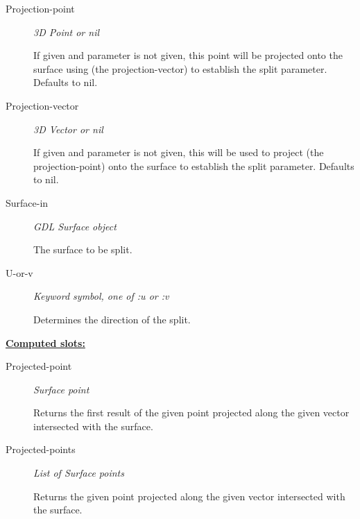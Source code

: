 \documentclass [11pt]{book}
\begin{document}
\begin{itemize}
\begin{description}
\item [Projection-point]
\emph{3D Point or nil}

 If given and parameter is not given,
this point will be projected onto the surface using (the projection-vector)
to establish the split parameter. Defaults to nil.




\item [Projection-vector]
\emph{3D Vector or nil}

 If given and parameter is not given,
this will be used to project (the projection-point)
onto the surface to establish the split parameter.
Defaults to nil.




\item [Surface-in]
\emph{GDL Surface object}

 The surface to be split.




\item [U-or-v]
\emph{Keyword symbol, one of :u or :v}

 Determines the direction of the split.




\end{description}






\textbf{
\underline{Computed slots:}}

\begin{description}

\item [Projected-point]
\emph{Surface point}

 Returns the first result of the given point projected
along the given vector intersected with the surface.




\item [Projected-points]
\emph{List of Surface points}

 Returns the given point projected along
the given vector intersected with the surface.




\end{description}








\end{itemize}
\end{document}
